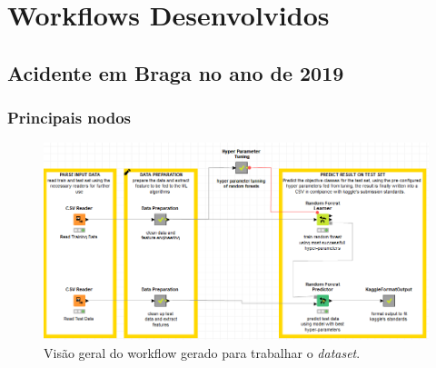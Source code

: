 \section{Workflows Desenvolvidos}
\subsection{Acidente em Braga no ano de 2019}
    \subsubsection{Principais nodos}
        \begin{figure}[H]
            \centering
            \includegraphics[scale=0.35
            ]{Figures/wf_braga.png}
            \caption{Visão geral do workflow gerado para trabalhar o \textit{dataset}.}
            \label{fig:"um"}
        \end{figure} 
        

